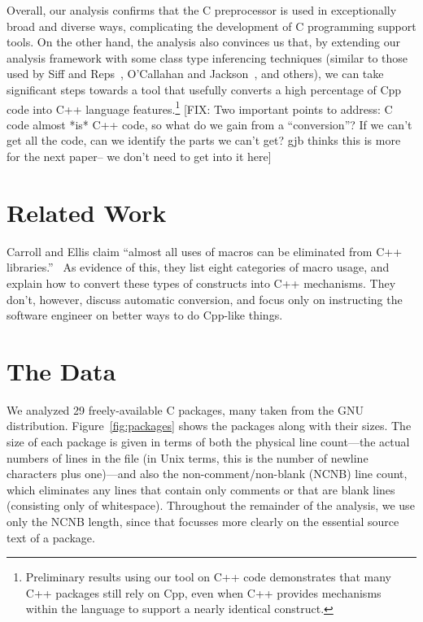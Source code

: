 Overall, our analysis confirms that the C preprocessor is used in
exceptionally broad and diverse ways, complicating the development of C
programming support tools.  On the other hand, the analysis also
convinces us that, by extending our analysis framework with some class
type inferencing techniques (similar to those used by Siff and
Reps~\cite{Siff-fse96}, O'Callahan and Jackson~\cite{OCallahan-icse97},
and others), we can take significant steps towards a tool that usefully
converts a high percentage of Cpp code into C++ language
features.\footnote{Preliminary results using our tool on C++ code
  demonstrates that many C++ packages still rely on Cpp, even when C++
  provides mechanisms within the language to support a nearly identical
  construct.} 
[FIX: Two important points to address: C code almost *is*
C++ code, so what do we gain from a ``conversion''?  If we can't get all
the code, can we identify the parts we can't get?
gjb thinks this is more for the next paper-- we don't need to get into
it here]

\section{Related Work}\label{sec:related}

Carroll and Ellis claim ``almost all uses of macros can be eliminated from
C++ libraries.''~\cite{Carroll95}  As evidence of this, they list eight
categories of macro usage, and explain how to convert these types of
constructs into C++ mechanisms.  They don't, however, discuss automatic
conversion, and focus only on instructing the software engineer on
better ways to do Cpp-like things.



\section{The Data}\label{sec:gathering}

We analyzed 29 freely-available C packages, many taken from the GNU
distribution.  Figure~\ref{fig:packages} shows the packages along with
their sizes.  The size of each package is given in terms of both the
physical line count---the actual numbers of lines in the file (in Unix
terms, this is the number of newline characters plus one)---and also the
non-comment/non-blank (NCNB) line count, which eliminates any lines that
contain only comments or that are blank lines (consisting only of
whitespace).  Throughout the remainder of the analysis, we use only the
NCNB length, since that focusses more clearly on the essential source
text of a package.

